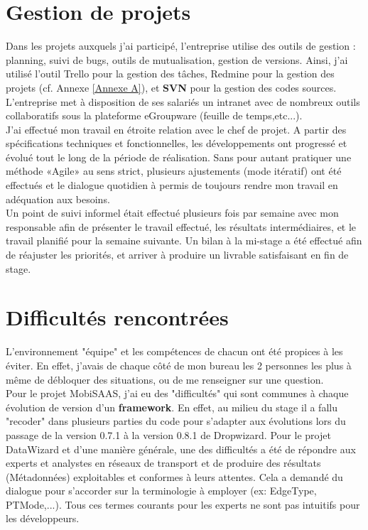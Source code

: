 \section{Gestion de projets}

Dans les projets auxquels j'ai participé, l'entreprise utilise des outils de gestion : planning, suivi de bugs, outils de mutualisation, gestion de versions. Ainsi, j'ai utilisé l'outil Trello pour la gestion des tâches, Redmine pour la gestion des projets (cf. Annexe \ref{Annexe A}), et \textbf{SVN} pour la gestion des codes sources. L'entreprise met à disposition de ses salariés un intranet avec de nombreux outils collaboratifs sous la plateforme eGroupware (feuille de temps,etc...).\\

J'ai effectué mon travail en étroite relation avec le chef de projet. A partir des spécifications techniques et fonctionnelles, les développements ont progressé et évolué tout le long de la période de réalisation. Sans pour autant pratiquer une méthode «Agile» au sens strict, plusieurs ajustements (mode itératif) ont été effectués et le dialogue quotidien à permis de toujours rendre mon travail en adéquation aux besoins. \\

Un point de suivi informel était effectué plusieurs fois par semaine avec mon responsable afin de présenter le travail effectué, les résultats intermédiaires, et le travail planifié pour la semaine suivante. Un bilan à la mi-stage a été effectué afin de réajuster les priorités, et arriver à produire un livrable satisfaisant en fin de stage. \\


\section{Difficultés rencontrées}

L'environnement "équipe" et les compétences de chacun ont été propices à les éviter. En effet, j'avais de chaque côté de mon bureau les 2 personnes les plus à même de débloquer des situations, ou de me renseigner sur une question. \\

Pour le projet MobiSAAS, j'ai eu des "difficultés" qui sont communes à chaque évolution de version d'un \textbf{framework}. En effet, au milieu du stage il a fallu "recoder" dans plusieurs parties du code pour s'adapter aux évolutions lors du passage de la version 0.7.1 à la version 0.8.1 de Dropwizard.
Pour le projet DataWizard et d'une manière générale, une des difficultés a été de répondre aux experts et analystes en réseaux de transport et de produire des résultats (Métadonnées) exploitables et conformes à leurs attentes. Cela a demandé du dialogue pour s'accorder sur la terminologie à employer (ex: EdgeType, PTMode,...). Tous ces termes courants pour les experts ne sont pas intuitifs pour les développeurs. \\
